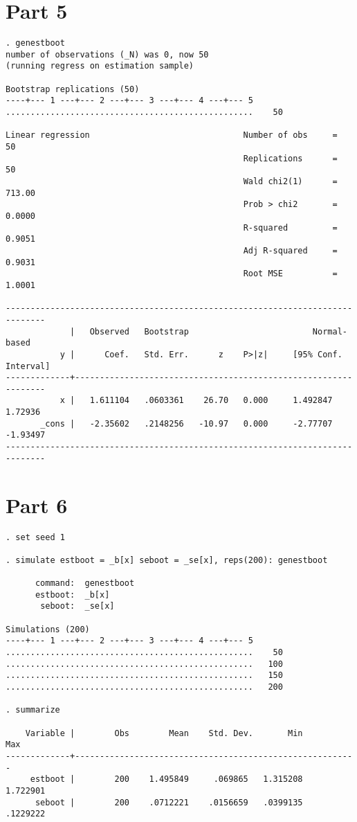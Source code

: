 \documentclass{article}
\begin{document}
\section{Part 5}
\begin{lstlisting}
. genestboot
number of observations (_N) was 0, now 50
(running regress on estimation sample)

Bootstrap replications (50)
----+--- 1 ---+--- 2 ---+--- 3 ---+--- 4 ---+--- 5 
..................................................    50

Linear regression                               Number of obs     =         50
                                                Replications      =         50
                                                Wald chi2(1)      =     713.00
                                                Prob > chi2       =     0.0000
                                                R-squared         =     0.9051
                                                Adj R-squared     =     0.9031
                                                Root MSE          =     1.0001

------------------------------------------------------------------------------
             |   Observed   Bootstrap                         Normal-based
           y |      Coef.   Std. Err.      z    P>|z|     [95% Conf. Interval]
-------------+----------------------------------------------------------------
           x |   1.611104   .0603361    26.70   0.000     1.492847     1.72936
       _cons |   -2.35602   .2148256   -10.97   0.000     -2.77707    -1.93497
------------------------------------------------------------------------------

\end{lstlisting}


\section{Part 6}
\begin{lstlisting}
. set seed 1

. simulate estboot = _b[x] seboot = _se[x], reps(200): genestboot

      command:  genestboot
      estboot:  _b[x]
       seboot:  _se[x]

Simulations (200)
----+--- 1 ---+--- 2 ---+--- 3 ---+--- 4 ---+--- 5 
..................................................    50
..................................................   100
..................................................   150
..................................................   200

. summarize

    Variable |        Obs        Mean    Std. Dev.       Min        Max
-------------+---------------------------------------------------------
     estboot |        200    1.495849     .069865   1.315208   1.722901
      seboot |        200    .0712221    .0156659   .0399135   .1229222

\end{lstlisting}
\end{document}
